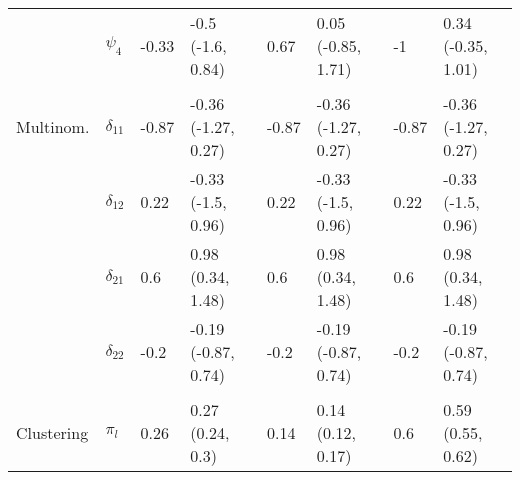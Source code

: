 \documentclass[]{article}
\begin{document}
\begin{table}[t]
\begin{tabular}{llllllll}
\hspace{1em} & $\psi_{4}$ & -0.33 & -0.5 (-1.6, 0.84) & 0.67 & 0.05 (-0.85, 1.71) & -1 & 0.34 (-0.35, 1.01)\\
\addlinespace[0.3em]
\multicolumn{8}{l}{\textbf{ }}\\
\hspace{1em}Multinom. & $\delta_{11}$ & -0.87 & -0.36 (-1.27, 0.27) & -0.87 & -0.36 (-1.27, 0.27) & -0.87 & -0.36 (-1.27, 0.27)\\
\hspace{1em} & $\delta_{12}$ & 0.22 & -0.33 (-1.5, 0.96) & 0.22 & -0.33 (-1.5, 0.96) & 0.22 & -0.33 (-1.5, 0.96)\\
\hspace{1em} & $\delta_{21}$ & 0.6 & 0.98 (0.34, 1.48) & 0.6 & 0.98 (0.34, 1.48) & 0.6 & 0.98 (0.34, 1.48)\\
\hspace{1em} & $\delta_{22}$ & -0.2 & -0.19 (-0.87, 0.74) & -0.2 & -0.19 (-0.87, 0.74) & -0.2 & -0.19 (-0.87, 0.74)\\
\addlinespace[0.3em]
\multicolumn{8}{l}{\textbf{ }}\\
\hspace{1em}Clustering & $\pi_l$ & 0.26 & 0.27 (0.24, 0.3) & 0.14 & 0.14 (0.12, 0.17) & 0.6 & 0.59 (0.55, 0.62)\\
\bottomrule
\end{tabular}
\end{table}
\end{document}
